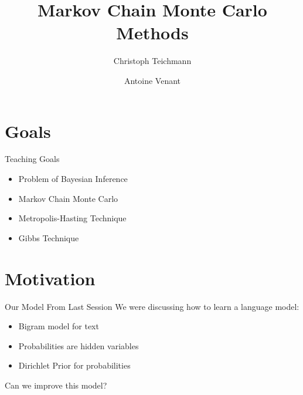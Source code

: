 \documentclass[11pt]{beamer}
\author{Christoph Teichmann \and Antoine Venant}
\title{Markov Chain Monte Carlo Methods}
\subtitle{}
\institute{}
\date{}
\begin{document}
	\centering
	
	
	\begin{frame}
		\maketitle
	\end{frame}
	
	\section{Goals}
	
	\begin{frame}{Teaching Goals}
		\begin{itemize}
			\item Problem of Bayesian Inference
			\item Markov Chain Monte Carlo
			\item Metropolis-Hasting Technique
			\item Gibbs Technique
		\end{itemize}
	\end{frame}
	
	\section{Motivation}
	
	\begin{frame}{Our Model From Last Session}
		We were discussing how to learn a language model:
		
		\vspace{10pt} \begin{itemize}
			\item Bigram model for text
			\item Probabilities are hidden variables
			\item Dirichlet Prior for probabilities
		\end{itemize}
		
		\vspace{10pt} Can we improve this model?
	\end{frame}
		
\end{document}
